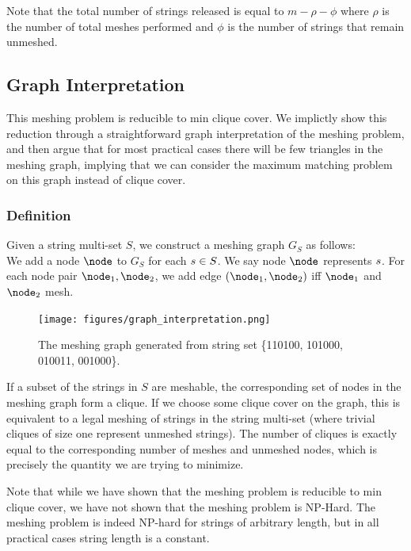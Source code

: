 Note that the total number of strings released is equal to $m - \rho - \phi$ where $\rho$ is the number of total meshes performed and $\phi$ is the number of strings that remain unmeshed.

\subsection{Graph Interpretation}
This meshing problem is reducible to min clique cover.  We implictly show this reduction through a straightforward graph interpretation of the meshing problem, and then argue that for most practical cases there will be few triangles in the meshing graph, implying that we can consider the maximum matching problem on this graph instead of clique cover.
\subsubsection{Definition}
Given a string multi-set $S$, we construct a meshing graph $G_S$ as follows:\\
We add a node $\node$ to $G_S$ for each $s \in S$.  We say node $\node$ represents $s$.  For each node pair $\node_1, \node_2$, we add edge $(\node_1, \node_2)$ iff $\node_1$ and $\node_2$ mesh.

\begin{figure}[h]
\texttt{[image: figures/graph\_interpretation.png]}
\centering
\caption{The meshing graph generated from string set \{110100, 101000, 010011, 001000\}.}
\end{figure}

If a subset of the strings in $S$ are meshable, the corresponding set of nodes in the meshing graph form a clique.  If we choose some clique cover on the graph, this is equivalent to a legal meshing of strings in the string multi-set (where trivial cliques of size one represent unmeshed strings).  The number of cliques is exactly equal to the corresponding number of meshes and unmeshed nodes, which is precisely the quantity we are trying to minimize.


Note that while we have shown that the meshing problem is reducible to min clique cover, we have not shown that the meshing problem is NP-Hard.  The meshing problem is indeed NP-hard for strings of arbitrary length, but in all practical cases string length is a constant.  


